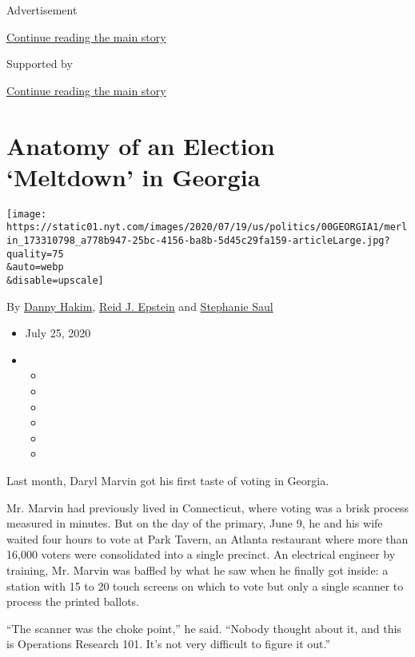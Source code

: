 Advertisement

\protect\hyperlink{after-top}{Continue reading the main story}

Supported by

\protect\hyperlink{after-sponsor}{Continue reading the main story}

\hypertarget{anatomy-of-an-election-meltdown-in-georgia}{%
\section{Anatomy of an Election `Meltdown' in
Georgia}\label{anatomy-of-an-election-meltdown-in-georgia}}

\texttt{[image: https://static01.nyt.com/images/2020/07/19/us/politics/00GEORGIA1/merlin\_173310798\_a778b947-25bc-4156-ba8b-5d45c29fa159-articleLarge.jpg?quality=75\\\&auto=webp\\\&disable=upscale]}

By \href{https://www.nytimes.com/by/danny-hakim}{Danny Hakim},
\href{https://www.nytimes.com/by/reid-j-epstein}{Reid J. Epstein} and
\href{https://www.nytimes.com/by/stephanie-saul}{Stephanie Saul}

\begin{itemize}
\item
  July 25, 2020
\item
  \begin{itemize}
  \item
  \item
  \item
  \item
  \item
  \item
  \end{itemize}
\end{itemize}

Last month, Daryl Marvin got his first taste of voting in Georgia.

Mr. Marvin had previously lived in Connecticut, where voting was a brisk
process measured in minutes. But on the day of the primary, June 9, he
and his wife waited four hours to vote at Park Tavern, an Atlanta
restaurant where more than 16,000 voters were consolidated into a single
precinct. An electrical engineer by training, Mr. Marvin was baffled by
what he saw when he finally got inside: a station with 15 to 20 touch
screens on which to vote but only a single scanner to process the
printed ballots.

``The scanner was the choke point,'' he said. ``Nobody thought about it,
and this is Operations Research 101. It's not very difficult to figure
it out.''

